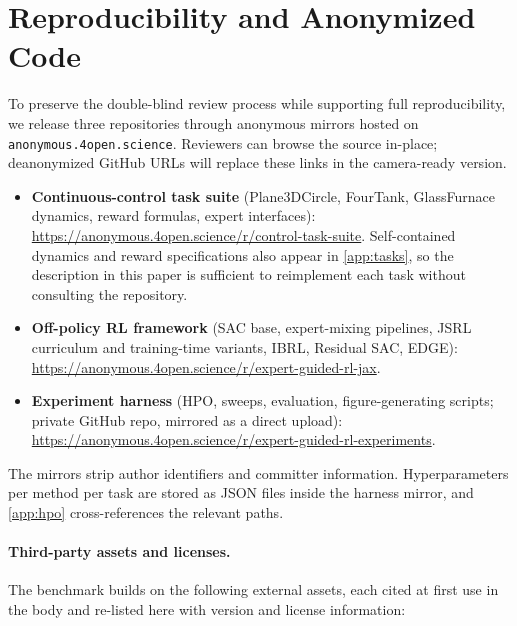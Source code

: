 \documentclass{article}
\begin{document}
\section{Reproducibility and Anonymized Code}
\label{app:reproducibility}

To preserve the double-blind review process while supporting full
reproducibility, we release three repositories through anonymous
mirrors hosted on \texttt{anonymous.4open.science}. Reviewers can
browse the source in-place; deanonymized GitHub URLs will replace these
links in the camera-ready version.

\begin{itemize}
    \item \textbf{Continuous-control task suite} (Plane3DCircle,
    FourTank, GlassFurnace dynamics, reward formulas, expert
    interfaces): \url{https://anonymous.4open.science/r/control-task-suite}.
    Self-contained dynamics and reward specifications also appear in
    \cref{app:tasks}, so the description in this paper is
    sufficient to reimplement each task without consulting the
    repository.
    \item \textbf{Off-policy RL framework} (SAC base, expert-mixing
    pipelines, JSRL curriculum and training-time variants, IBRL,
    Residual SAC, EDGE): \url{https://anonymous.4open.science/r/expert-guided-rl-jax}.
    \item \textbf{Experiment harness} (HPO, sweeps, evaluation,
    figure-generating scripts; private GitHub repo, mirrored as a
    direct upload): \url{https://anonymous.4open.science/r/expert-guided-rl-experiments}.
\end{itemize}

The mirrors strip author identifiers and committer information.
Hyperparameters per method per task are stored as JSON files inside
the harness mirror, and \cref{app:hpo} cross-references the
relevant paths.

\paragraph{Third-party assets and licenses.}
The benchmark builds on the following external assets, each cited at
first use in the body and re-listed here with version and license
information:
\end{document}
